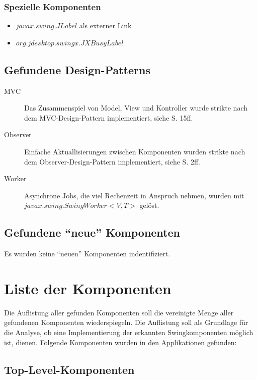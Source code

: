   \subsubsection{Spezielle Komponenten}
    
  \begin{itemize}
    \item \(javax.swing.JLabel\) als externer Link
    \item \(org.jdesktop.swingx.JXBusyLabel\)
  \end{itemize}
  
  \subsection{Gefundene Design-Patterns} 
  
  \begin{description}
    \item[MVC]
    Das Zusammenspiel von Model, View und Kontroller wurde strikte nach dem
    MVC-Design-Pattern implementiert, siehe \cite{GUIDesignPatterns} S. 15ff.
    \item[Observer]
    Einfache Aktuallisierungen zwischen Komponenten wurden strikte nach dem
    Observer-Design-Pattern implementiert, siehe \cite{GUIDesignPatterns} S.
    2ff.
    \item[Worker]
    Asynchrone Jobs, die viel Rechenzeit in Anspruch nehmen, wurden mit\\
    \(javax.swing.SwingWorker<V,T>\) gelöst.
  \end{description}
  
  \subsection{Gefundene ``neue'' Komponenten}
  
  Es wurden keine ``neuen'' Komponenten indentifiziert.
  
  \section{Liste der Komponenten}
  
  Die Auflistung aller gefunden Komponenten soll die vereinigte Menge aller
  gefundenen Komponenten wiederspiegeln. Die Auflistung soll als Grundlage für
  die Analyse, ob eine Implementierung der erkannten Swingkomponenten möglich
  ist, dienen. Folgende Komponenten wurden in den Applikationen gefunden:
  
  \subsection{Top-Level-Komponenten}
  
